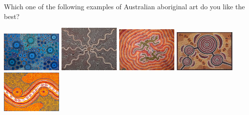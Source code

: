 
\begin{tcolorbox}
Which one of the following examples of Australian aboriginal art do you like the best?

\includegraphics[width=3cm]{Population_study_design/Aboriginal_art1.jpg}
\includegraphics[width=3cm]{Population_study_design/Aboriginal_art2.jpg}
\includegraphics[width=3cm]{Population_study_design/Aboriginal_art3.jpg}
\includegraphics[width=3cm]{Population_study_design/Aboriginal_art4.jpg}
\includegraphics[width=3cm]{Population_study_design/Aboriginal_art5.jpg}
\end{tcolorbox}
